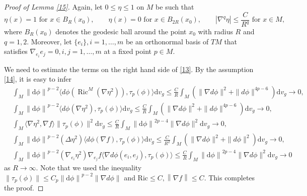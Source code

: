 \documentclass[12pt,UTF8]{article}
\theoremstyle{plain}
\theoremstyle{definition}
\def\d {\mathrm{d}}
\def\Ric {\mathrm{Ric}}
\def\na{\ensuremath{\nabla}}
\renewcommand{\d}[1]{\mathbb{#1}}
\renewcommand{\(}{\left(}
\renewcommand{\)}{\right)}
\renewcommand{\leq}{\leqslant}
\newcommand{\norm}[1]{\left\lVert#1\right\rVert}%
\def\Ric{\mathrm{Ric\, }}
\numberwithin{equation}{subsection}
\def\na{\nabla}
\newcommand{\dv}{\operatorname{div}}
\renewcommand{\leq}{\leqslant}
\renewcommand{\(}{\left(}
\renewcommand{\)}{\right)}
\def\d{\mathrm{d}}
\def \d {\mathrm{d}}
\def \Ric {\mathrm{Ric}}
\def\dv{\d v_g}
\numberwithin{equation}{section}
\begin{document}
\begin{proof}[Proof of Lemma \ref{15}]
	Again, let  $0\leq\eta\leq 1$ on $M$ be such that
	\begin{equation*}
		\eta(x)=1\textrm{ for } x\in B_R(x_0),\qquad \eta(x)=0\textrm{ for } x\in B_{2R}(x_0),\qquad |\nabla^q\eta|\leq\frac{C}{R^q}\textrm{ for } x\in M,
	\end{equation*}
	where $B_R(x_0)$ denotes the geodesic ball around the point $x_0$ with radius $R$ and $q=1,2$.
	Moreover, let $\{e_i\},i=1,\ldots,m$ be an orthonormal basis of $TM$ that satisfies 
	$\nabla_{e_i}e_j=0,i,j=1,\ldots,m$ at a fixed point $p\in M$.
	
	We need to estimate the terms on 	the right hand side of \eqref{13}. 	By the  assumption \eqref{14},	it is easy to infer
	\begin{align*}
		&\int_M \norm{\d \phi}^{p-2}\langle d\phi(\operatorname{Ric}^M(\nabla\eta^2)),\tau_p(\phi)\rangle \dv\leq\frac{C}{R}\int_M(\|\na d\phi\|^2+\|d\phi\|^{4p-6})\dv \to 0, \\
		&\int_M \norm{\d \phi}^{p-2} \langle d\phi(\nabla\eta^2),\tau_p(\phi)\rangle \dv 
		\leq\frac{C}{R}\int_M(\|\na d\phi\|^2+\|d\phi\|^{4p-6})\dv 
		\to 0,  \\
		&\int_M\langle\nabla\eta^2,\nabla f\rangle\|\tau_p(\phi)\|^2 \dv 
		\leq\frac{C}{R}\int_M \norm{\d \phi}^{2p-4}\|\na d\phi\|^2\dv 
		\to 0, \\
	&\int_M \norm{\d \phi}^{p-2}(\Delta\eta^2)\langle d\phi(\nabla f),\tau_p(\phi)\rangle \dv 
		\leq\frac{C}{R^2}\int_M(\|\na d\phi\|^2+\|d\phi\|^2)\dv 
		\to 0, \\
		&\int_M\norm{\d \phi}^{p-2}(\nabla_{e_i}\eta^2)\nabla_{e_j}f\langle\na d\phi(e_i,e_j),\tau_p(\phi)\rangle 
		\leq\frac{C}{R}\int_M\norm{\d \phi}^{2p-4} \|\na d\phi\|^2 \dv\to 0
	\end{align*}
	as $R\to\infty$.
	Note that we used the inequality $\|\tau_p(\phi)\|\leq C_p \norm{\d \phi}^{p-2}\|\na d\phi\|$ and $ \Ric\leq C, \norm{\na f}\leq C$.
	This completes the proof.
\end{proof}
\end{document}
